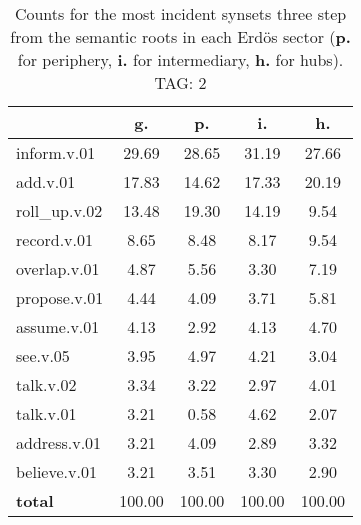 \begin{table}[h!]
\begin{center}
\begin{tabular}{| l || c | c | c | c |}\hline
 & {\bf g.} & {\bf p.} & {\bf i.} & {\bf h.} \\\hline\hline
inform.v.01 & 29.69  & 28.65  & 31.19  & 27.66 \\\hline
add.v.01 & 17.83  & 14.62  & 17.33  & 20.19 \\\hline
roll\_up.v.02 & 13.48  & 19.30  & 14.19  & 9.54 \\\hline
record.v.01 & 8.65  & 8.48  & 8.17  & 9.54 \\\hline
overlap.v.01 & 4.87  & 5.56  & 3.30  & 7.19 \\\hline
propose.v.01 & 4.44  & 4.09  & 3.71  & 5.81 \\\hline
assume.v.01 & 4.13  & 2.92  & 4.13  & 4.70 \\\hline
see.v.05 & 3.95  & 4.97  & 4.21  & 3.04 \\\hline
talk.v.02 & 3.34  & 3.22  & 2.97  & 4.01 \\\hline
talk.v.01 & 3.21  & 0.58  & 4.62  & 2.07 \\\hline
address.v.01 & 3.21  & 4.09  & 2.89  & 3.32 \\\hline
believe.v.01 & 3.21  & 3.51  & 3.30  & 2.90 \\\hline\hline
{{\bf total}} & 100.00  & 100.00  & 100.00  & 100.00 \\\hline
\end{tabular}
\caption{Counts for the most incident synsets three step from the semantic roots in each Erd\"os sector ({\bf p.} for periphery, {\bf i.} for intermediary, {\bf h.} for hubs). TAG: 2}
\end{center}
\end{table}